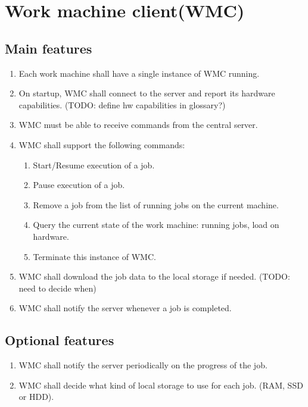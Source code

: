 \section{Work machine client(WMC)}
\subsection{Main features}
\begin{enumerate}
  \item Each work machine shall have a single instance of WMC running.
  \item On startup, WMC shall connect to the server and report its hardware capabilities. (TODO: define hw capabilities in glossary?)
  \item WMC must be able to receive commands from the central server.
  \item WMC shall support the following commands:
  \begin{enumerate}
    \item Start/Resume execution of a job.
    \item Pause execution of a job.
    \item Remove a job from the list of running jobs on the current machine.
    \item Query the current state of the work machine: running jobs, load on hardware.
    \item Terminate this instance of WMC.
  \end{enumerate}
  \item WMC shall download the job data to the local storage if needed. (TODO: need to decide when)
  \item WMC shall notify the server whenever a job is completed.
\end{enumerate}
\subsection{Optional features}
  \begin{enumerate}
    \item WMC shall notify the server periodically on the progress of the job.
    \item WMC shall decide what kind of local storage to use for each job. (RAM, SSD or HDD).
  \end{enumerate}
